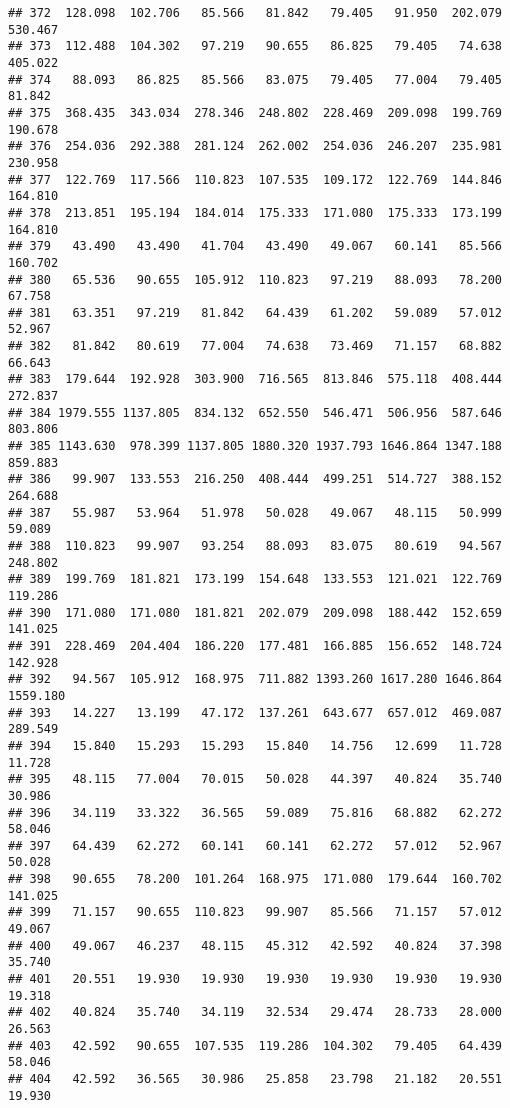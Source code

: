 \documentclass[
]{article}
\begin{document}
\begin{verbatim}
## 372  128.098  102.706   85.566   81.842   79.405   91.950  202.079  530.467
## 373  112.488  104.302   97.219   90.655   86.825   79.405   74.638  405.022
## 374   88.093   86.825   85.566   83.075   79.405   77.004   79.405   81.842
## 375  368.435  343.034  278.346  248.802  228.469  209.098  199.769  190.678
## 376  254.036  292.388  281.124  262.002  254.036  246.207  235.981  230.958
## 377  122.769  117.566  110.823  107.535  109.172  122.769  144.846  164.810
## 378  213.851  195.194  184.014  175.333  171.080  175.333  173.199  164.810
## 379   43.490   43.490   41.704   43.490   49.067   60.141   85.566  160.702
## 380   65.536   90.655  105.912  110.823   97.219   88.093   78.200   67.758
## 381   63.351   97.219   81.842   64.439   61.202   59.089   57.012   52.967
## 382   81.842   80.619   77.004   74.638   73.469   71.157   68.882   66.643
## 383  179.644  192.928  303.900  716.565  813.846  575.118  408.444  272.837
## 384 1979.555 1137.805  834.132  652.550  546.471  506.956  587.646  803.806
## 385 1143.630  978.399 1137.805 1880.320 1937.793 1646.864 1347.188  859.883
## 386   99.907  133.553  216.250  408.444  499.251  514.727  388.152  264.688
## 387   55.987   53.964   51.978   50.028   49.067   48.115   50.999   59.089
## 388  110.823   99.907   93.254   88.093   83.075   80.619   94.567  248.802
## 389  199.769  181.821  173.199  154.648  133.553  121.021  122.769  119.286
## 390  171.080  171.080  181.821  202.079  209.098  188.442  152.659  141.025
## 391  228.469  204.404  186.220  177.481  166.885  156.652  148.724  142.928
## 392   94.567  105.912  168.975  711.882 1393.260 1617.280 1646.864 1559.180
## 393   14.227   13.199   47.172  137.261  643.677  657.012  469.087  289.549
## 394   15.840   15.293   15.293   15.840   14.756   12.699   11.728   11.728
## 395   48.115   77.004   70.015   50.028   44.397   40.824   35.740   30.986
## 396   34.119   33.322   36.565   59.089   75.816   68.882   62.272   58.046
## 397   64.439   62.272   60.141   60.141   62.272   57.012   52.967   50.028
## 398   90.655   78.200  101.264  168.975  171.080  179.644  160.702  141.025
## 399   71.157   90.655  110.823   99.907   85.566   71.157   57.012   49.067
## 400   49.067   46.237   48.115   45.312   42.592   40.824   37.398   35.740
## 401   20.551   19.930   19.930   19.930   19.930   19.930   19.930   19.318
## 402   40.824   35.740   34.119   32.534   29.474   28.733   28.000   26.563
## 403   42.592   90.655  107.535  119.286  104.302   79.405   64.439   58.046
## 404   42.592   36.565   30.986   25.858   23.798   21.182   20.551   19.930

\end{verbatim}
\end{document}
